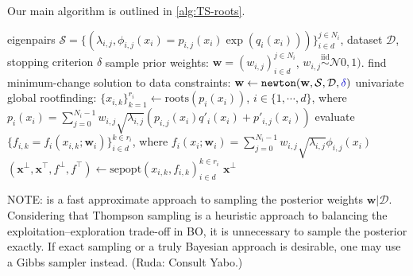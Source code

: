 \documentclass{article}
\newcommand{\cmtR}[1]{\textcolor{red!50!black}{(Ruda: #1)}} %
\newcommand{\edit}[1]{\textcolor{blue!80!black}{#1}} %
\begin{document}
Our main algorithm is outlined in \cref{alg:TS-roots}.

\begin{algorithm}[h]
  \caption{\texttt{TS-roots}: Global optimization of a separable %
    Thompson sample via rootfinding.}
  \label{alg:TS-roots}
  \begin{algorithmic}[1] %
    \Input eigenpairs
    $\mathcal{S} = \{(\lambda_{i,j}, \phi_{i,j}(x_i) = p_{i,j}(x_i) \exp(q_i(x_i)))\}_{i \in d}^{j \in N_i}$,
    dataset $\mathcal{D}$,
    \edit{stopping criterion $\delta$}
    \State sample prior weights: $\mathbf{w} = (w_{i,j})_{i \in d}^{j \in N_i}$,
    $w_{i,j} \overset{\text{iid}}{\sim} \mathcal{N}0, 1)$.
    \State find minimum-change solution to data constraints:
    $\mathbf{w} \gets \texttt{newton}(\mathbf{w}, \mathcal{S}, \mathcal{D}, \edit{\delta})$
    \State univariate global rootfinding: $\{x_{i,k}\}_{k=1}^{r_i} \gets \mathrm{roots}(p_i(x_i))$,
    $i \in \{1, \cdots, d\}$, where \newline
    $p_i(x_i) = \sum_{j=0}^{N_i - 1} w_{i,j} \sqrt{\lambda_{i,j}} (p_{i,j}(x_i) q'_i(x_i) + p'_{i,j}(x_i))$
    \State evaluate $\{f_{i,k} = f_i(x_{i,k}; \mathbf{w}_i)\}_{i \in d}^{k \in r_i}$, where
    $f_i(x_i; \mathbf{w}_i) = \sum_{j=0}^{N_i - 1} w_{i,j} \sqrt{\lambda_{i,j}} \phi_{i,j}(x_i)$
    \State $(\mathbf{x}^\bot, \mathbf{x}^\top, f^\bot, f^\top) \gets
    \mathrm{sepopt}(x_{i,k}, f_{i,k})_{i \in d}^{k \in r_i}$
    \Output $\mathbf{x}^\bot$
  \end{algorithmic}
\end{algorithm}

NOTE:  is a fast approximate approach to sampling the posterior
weights $\mathbf{w} | \mathcal{D}$. Considering that Thompson sampling
is a heuristic approach to balancing the exploitation--exploration
trade-off in BO, it is unnecessary to sample the posterior exactly. If
exact sampling or a truly Bayesian approach is desirable, one may use a
Gibbs sampler instead. \cmtR{Consult Yabo.}
\end{document}
